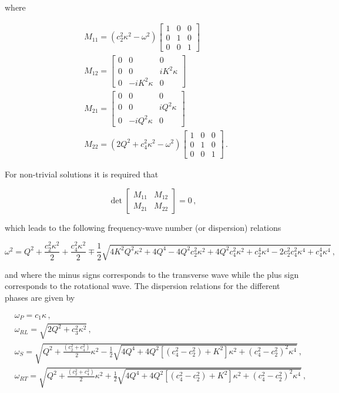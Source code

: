 \documentclass[12pt]{article}
\begin{document}
where

\begin{align*}
&M_{11} =
(c_{2}^{2} \kappa^{2} - \omega^{2})
\begin{bmatrix}
1 & 0 & 0\\
0 & 1 & 0 \\
0 & 0 & 1
\end{bmatrix}\\
&M_{12} =
\begin{bmatrix}
0 & 0 & 0\\
0 & 0 & i K^{2} \kappa\\
0 & -i K^{2} \kappa & 0
\end{bmatrix}\\
&M_{21} =
\begin{bmatrix}
0 & 0 & 0 \\
0 & 0 & i Q^{2} \kappa \\
0 & -i Q^{2} \kappa & 0 
\end{bmatrix}\\
&M_{22} =
(2 Q^{2} + c_{4}^{2} \kappa^{2} - \omega^{2})\begin{bmatrix}
1 &0 &0\\
0 &1 &0\\
0 &0 &1
\end{bmatrix}\, .
\end{align*}

For non-trivial solutions it is required that

\[\det\begin{bmatrix}
M_{11} &M_{12}\\
M_{21} &M_{22}\end{bmatrix}=0\, ,\]

which leads to the following frequency-wave number (or dispersion) relations

\begin{equation*}
\omega^2 = Q^{2} + \frac{c_{2}^{2} \kappa^{2}}{2} + \frac{c_{4}^{2} \kappa^{2}}{2} \mp \frac{1}{2} \sqrt{4 K^{2} Q^{2} \kappa^{2} + 4 Q^{4} - 4 Q^{2} c_{2}^{2} \kappa^{2} + 4 Q^{2} c_{4}^{2} \kappa^{2} + c_{2}^{4} \kappa^{4} - 2 c_{2}^{2} c_{4}^{2} \kappa^{4} + c_{4}^{4} \kappa^{4}}\, ,
\end{equation*}

and where the minus signs corresponds to the transverse wave while the plus sign corresponds to the rotational wave. The dispersion relations for the different phases are given by

\begin{align}
&\omega_P = c_1 \kappa\, ,\\
&\omega_{RL} = \sqrt{2Q^2 + c_3^2 \kappa^2}\, ,\\
&\omega_S = \sqrt{Q^{2} + \frac{(c_2^2 + c_4^2)}{2}\kappa^2 - \frac{1}{2} \sqrt{4Q^4 +
   4Q^2[(c_4^2 - c_2^2) + K^2]\kappa^2 + (c_4^2 - c_2^2)^2 \kappa^4}}\, ,\\
&\omega_{RT} = \sqrt{Q^{2} + \frac{(c_2^2 + c_4^2)}{2}\kappa^2 + \frac{1}{2} \sqrt{4Q^4 +
   4Q^2[(c_4^2 - c_2^2) + K^2]\kappa^2 + (c_4^2 - c_2^2)^2 \kappa^4}}\, ,
\end{align}
\end{document}
